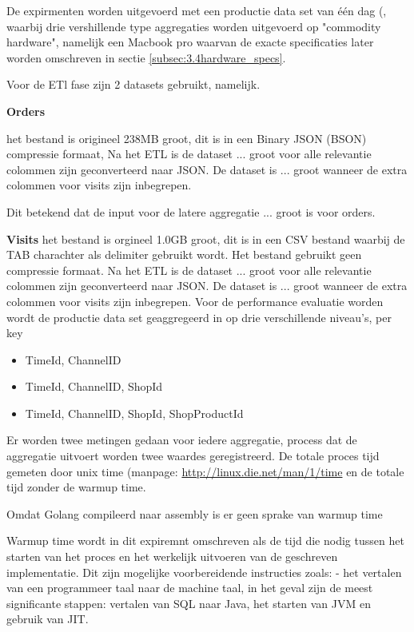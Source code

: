De expirmenten worden uitgevoerd met een productie data set van één dag (, waarbij drie vershillende type aggregaties worden uitgevoerd op "commodity hardware", namelijk een Macbook pro waarvan de exacte specificaties later worden omschreven in sectie \ref{subsec:3.4hardware_specs}.

Voor de ETl fase zijn 2 datasets gebruikt, namelijk.

\textbf{Orders}

het bestand is origineel 238MB groot, dit is in een Binary JSON (BSON) compressie formaat,
Na het ETL is de dataset ... groot voor alle relevantie colommen zijn geconverteerd naar JSON. De dataset is ... groot wanneer de extra colommen voor visits zijn inbegrepen. 

Dit betekend dat de input voor de latere aggregatie ... groot is voor orders.

\textbf{Visits}
het bestand is orgineel 1.0GB groot, dit is in een CSV bestand waarbij de TAB charachter als delimiter gebruikt wordt. Het bestand gebruikt geen compressie formaat.
Na het ETL is de dataset ... groot voor alle relevantie colommen zijn geconverteerd naar JSON. De dataset is ... groot wanneer de extra colommen voor visits zijn inbegrepen. Voor de performance evaluatie worden wordt de productie data set geaggregeerd in op drie verschillende niveau's, per key

\begin{itemize}
    \item TimeId, ChannelID
    \item TimeId, ChannelID, ShopId
    \item TimeId, ChannelID, ShopId, ShopProductId
\end{itemize}

Er worden twee metingen gedaan voor iedere aggregatie,  process dat de aggregatie uitvoert worden twee waardes geregistreerd.  De totale proces tijd gemeten door unix time (manpage: \url{http://linux.die.net/man/1/time} en de totale tijd zonder de warmup time.

Omdat Golang compileerd naar assembly is er geen sprake van warmup time

Warmup time wordt in dit expiremnt omschreven als de tijd die nodig tussen het starten van het proces en het werkelijk uitvoeren van de geschreven implementatie. Dit zijn mogelijke voorbereidende instructies zoals:
- het vertalen van een programmeer taal naar de machine taal, in het geval zijn de meest significante stappen: vertalen van SQL naar Java, het starten van JVM en gebruik van JIT.


